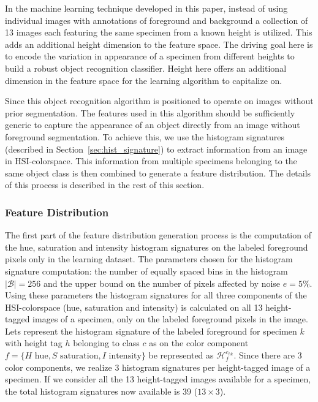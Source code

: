 \documentclass {udthesis}
\begin{document}
In the machine learning technique developed in this paper, instead of using individual images with annotations of foreground and background a collection of 13 images each featuring the same specimen from a known height is utilized. This adds an additional height dimension to the feature space. The driving goal here is to encode the variation in appearance of a specimen from different heights to build a robust object recognition classifier. Height here offers an additional dimension in the feature space for the learning algorithm to capitalize on.

Since this object recognition algorithm is positioned to operate on images without prior segmentation. The features used in this algorithm should be sufficiently generic to capture the appearance of an object directly from an image without foreground segmentation. To achieve this, we use the histogram signatures (described in Section~\ref{sec:hist_signature}) to extract information from an image in HSI-colorspace. This information from multiple specimens belonging to the same object class is then combined to generate a feature distribution. The details of this process is described in the rest of this section.

\subsubsection{Feature Distribution}
\label{sec:distdes_feature_distr}

The first part of the feature distribution generation process is the computation of the hue, saturation and intensity histogram signatures on the labeled foreground pixels only in the learning dataset. The parameters chosen for the histogram signature computation: the number of equally spaced bins in the histogram $|\mathcal{B}|=256$ and the upper bound on the number of pixels affected by noise $e=5\%$. Using these parameters the histogram signatures for all three components of the HSI-colorspace (hue, saturation and intensity) is calculated on all 13 height-tagged images of a specimen, only on the labeled foreground pixels in the image. Lets represent the histogram signature of the labeled foreground for specimen $k$ with height tag $h$ belonging to class $c$ as on the color component $f=\{H \text{ hue}, S \text{ saturation}, I \text{ intensity}\}$ be represented as $\mathcal{H}^{c_{hk}}_f$. Since there are 3 color components, we realize 3 histogram signatures per height-tagged image of a specimen. If we 
consider all the 13 height-tagged images available for a specimen, the total histogram signatures now available is 39 ($13 \times 3$).
\end{document}
